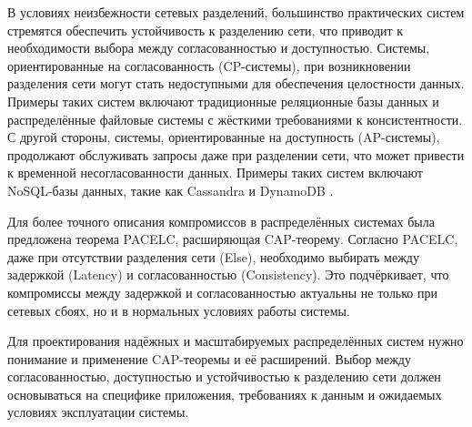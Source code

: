 В условиях неизбежности сетевых разделений, большинство практических систем стремятся обеспечить устойчивость к разделению сети, что приводит к необходимости выбора между согласованностью и доступностью. Системы, ориентированные на согласованность (CP-системы), при возникновении разделения сети могут стать недоступными для обеспечения целостности данных. Примеры таких систем включают традиционные реляционные базы данных и распределённые файловые системы с жёсткими требованиями к консистентности. С другой стороны, системы, ориентированные на доступность (AP-системы), продолжают обслуживать запросы даже при разделении сети, что может привести к временной несогласованности данных. Примеры таких систем включают NoSQL-базы данных, такие как Cassandra и DynamoDB \autocite{CAPTheoremIBM}.

Для более точного описания компромиссов в распределённых системах была предложена теорема PACELC, расширяющая CAP-теорему. Согласно PACELC, даже при отсутствии разделения сети (Else), необходимо выбирать между задержкой (Latency) и согласованностью (Consistency). Это подчёркивает, что компромиссы между задержкой и согласованностью актуальны не только при сетевых сбоях, но и в нормальных условиях работы системы.

Для проектирования надёжных и масштабируемых распределённых систем нужно понимание и применение CAP-теоремы и её расширений. Выбор между согласованностью, доступностью и устойчивостью к разделению сети должен основываться на специфике приложения, требованиях к данным и ожидаемых условиях эксплуатации системы.

